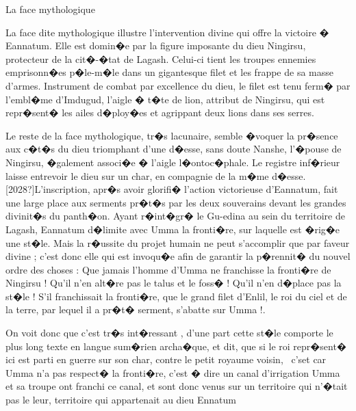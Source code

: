 \documentclass{article}
\begin{document}
\bigskip


\bigskip

La face {\textquotedbl}mythologique{\textquotedbl}


\bigskip

La face dite {\textquotedbl}mythologique{\textquotedbl} illustre l'intervention divine qui offre la victoire � Eannatum. Elle est domin�e par la figure imposante du dieu Ningirsu, protecteur de la cit�-�tat de Lagash. Celui-ci tient les troupes ennemies emprisonn�es p�le-m�le dans un gigantesque filet et les frappe de sa masse d'armes. Instrument de combat par excellence du dieu, le filet est tenu ferm� par l'embl�me d'Imdugud, l'aigle � t�te de lion, attribut de Ningirsu, qui est repr�sent� les ailes d�ploy�es et agrippant deux lions dans ses serres.

Le reste de la face {\textquotedbl}mythologique{\textquotedbl}, tr�s lacunaire, semble �voquer la pr�sence aux c�t�s du dieu triomphant d'une d�esse, sans doute Nanshe, l'�pouse de Ningirsu, �galement associ�e � l'aigle l�ontoc�phale. Le registre inf�rieur laisse entrevoir le dieu sur un char, en compagnie de la m�me d�esse.[2028?]L'inscription, apr�s avoir glorifi� l'action victorieuse d'Eannatum, fait une large place aux serments pr�t�s par les deux souverains devant les grandes divinit�s du panth�on. Ayant r�int�gr� le Gu-edina au sein du territoire de Lagash, Eannatum d�limite avec Umma la fronti�re, sur laquelle est �rig�e une st�le. Mais la r�ussite du projet humain ne peut s'accomplir que par faveur divine ; c'est donc elle qui est invoqu�e afin de garantir la p�rennit� du nouvel ordre des choses : {\textquotedbl}Que jamais l'homme d'Umma ne franchisse la fronti�re de Ningirsu ! Qu'il n'en alt�re pas le talus et le foss� ! Qu'il n'en d�place pas la st�le ! S'il franchissait la fronti�re, que le grand filet d'Enlil, le roi du ciel et de la terre, par lequel il a pr�t� serment, s'abatte sur Umma !{\textquotedbl}.


\bigskip


\bigskip

On voit donc que c'est tr�s int�ressant , d'une part cette st�le comporte le plus long texte en langue sum�rien archa�que, et dit, que si le roi repr�sent� ici est parti en guerre sur son char, contre le petit royaume voisin, \ c'set car Umma n'a pas respect� la fronti�re, c'est � dire un canal d'irrigation Umma et sa troupe ont franchi ce canal, et sont donc venus sur un territoire qui n'�tait pas le leur, territoire qui appartenait au dieu Ennatum
\end{document}
